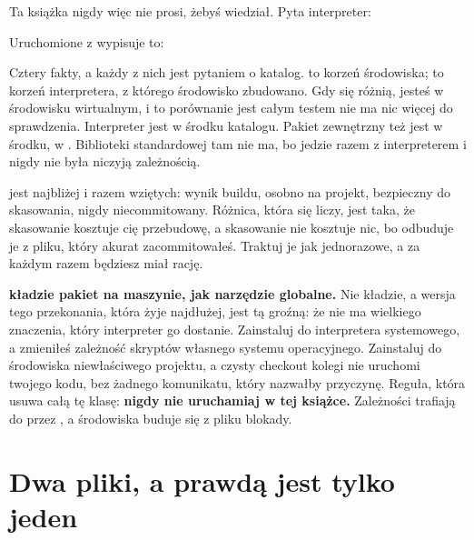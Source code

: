 Ta książka nigdy więc nie prosi, żebyś wiedział. Pyta interpreter:


\noindent
Uruchomione z  wypisuje to:


\noindent
Cztery fakty, a każdy z nich jest pytaniem o katalog.  to
korzeń środowiska;  to korzeń interpretera, z którego
środowisko zbudowano. Gdy się różnią, jesteś w środowisku wirtualnym, i to
porównanie jest całym testem \dash{} nie ma nic więcej do sprawdzenia.
Interpreter jest w środku katalogu. Pakiet zewnętrzny też jest w środku, w
. Biblioteki standardowej tam nie ma, bo jedzie razem z
interpreterem i nigdy nie była niczyją zależnością.

\begin{csbox}
 jest najbliżej  i  razem wziętych: wynik
buildu, osobno na projekt, bezpieczny do skasowania, nigdy niecommitowany.
Różnica, która się liczy, jest taka, że skasowanie  kosztuje cię
przebudowę, a skasowanie  nie kosztuje nic, bo 
odbuduje je z pliku, który akurat zacommitowałeś. Traktuj je jak
jednorazowe, a za każdym razem będziesz miał rację.
\end{csbox}

\begin{trapbox}
\textbf{ kładzie pakiet na maszynie, jak narzędzie globalne.}
Nie kładzie, a wersja tego przekonania, która żyje najdłużej, jest tą groźną:
że nie ma wielkiego znaczenia, który interpreter go dostanie. Zainstaluj do
interpretera systemowego, a zmieniłeś zależność skryptów własnego systemu
operacyjnego. Zainstaluj do środowiska niewłaściwego projektu, a czysty
checkout kolegi nie uruchomi twojego kodu, bez żadnego komunikatu, który
nazwałby przyczynę. Reguła, która usuwa całą tę klasę: \textbf{nigdy nie
uruchamiaj  w tej książce.} Zależności trafiają do
 przez , a środowiska buduje się z pliku
blokady.
\end{trapbox}


\section{Dwa pliki, a prawdą jest tylko jeden}
\label{sec:ch02-two-files}

